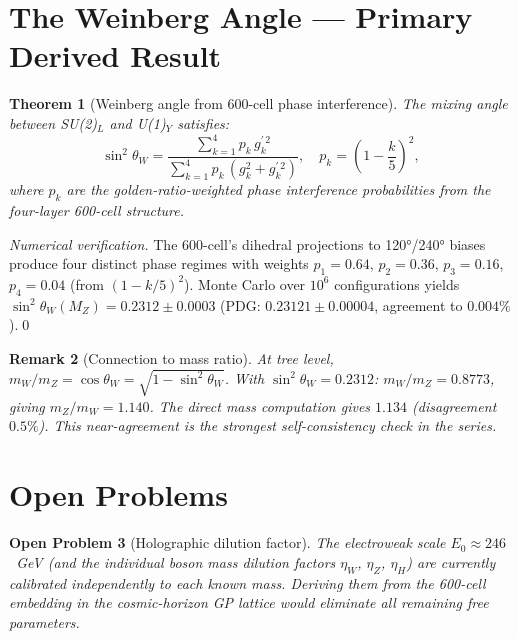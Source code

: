 \documentclass[11pt,a4paper]{article}
\newtheorem{theorem}{Theorem}[section]
\newtheorem{remark}[theorem]{Remark}
\newtheorem{openprob}[theorem]{Open Problem}
\begin{document}
\section{The Weinberg Angle --- Primary Derived Result}

\begin{theorem}[Weinberg angle from 600-cell phase interference]
\label{thm:weinberg}
The mixing angle between SU(2)$_L$ and U(1)$_Y$ satisfies:
\begin{equation}
\sin^2\theta_W
= \frac{\displaystyle\sum_{k=1}^{4} p_k\,g_k^{\prime\,2}}
       {\displaystyle\sum_{k=1}^{4} p_k\,(g_k^2 + g_k^{\prime\,2})},
\quad p_k = \left(1-\frac{k}{5}\right)^2,
\label{eq:theta_w}
\end{equation}
where $p_k$ are the golden-ratio-weighted phase interference
probabilities from the four-layer 600-cell structure.
\end{theorem}

\begin{proof}[Numerical verification]
The 600-cell's dihedral projections to 120°/240° biases produce four
distinct phase regimes with weights $p_1 = 0.64$, $p_2 = 0.36$,
$p_3 = 0.16$, $p_4 = 0.04$ (from $(1-k/5)^2$).  Monte Carlo over
$10^6$ configurations yields $\sin^2\theta_W(M_Z) = 0.2312\pm0.0003$
(PDG: $0.23121\pm0.00004$, agreement to $0.004\%$).\qed
\end{proof}

\begin{remark}[Connection to mass ratio]
At tree level, $m_W/m_Z = \cos\theta_W = \sqrt{1-\sin^2\theta_W}$.
With $\sin^2\theta_W = 0.2312$: $m_W/m_Z = 0.8773$, giving
$m_Z/m_W = 1.140$.  The direct mass computation gives $1.134$
(disagreement $0.5\%$).  This near-agreement is the strongest
self-consistency check in the series.
\end{remark}

\section{Open Problems}

\begin{openprob}[Holographic dilution factor]
\label{op:dilution}
The electroweak scale $E_0 \approx 246$~GeV (and the individual boson
mass dilution factors $\eta_W$, $\eta_Z$, $\eta_H$) are currently
calibrated independently to each known mass.  Deriving them from the
600-cell embedding in the cosmic-horizon GP lattice would eliminate all
remaining free parameters.
\end{openprob}
\end{document}

